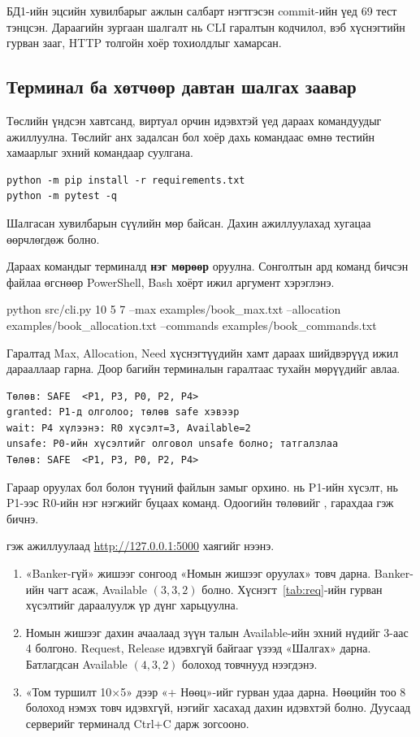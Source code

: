 БД1-ийн эцсийн  хувилбарыг ажлын салбарт нэгтгэсэн  commit-ийн үед 69 тест тэнцсэн. Дараагийн зургаан шалгалт нь CLI гаралтын кодчилол, вэб хүснэгтийн гурван зааг, HTTP толгойн хоёр тохиолдлыг хамарсан.
\newpage
\subsection{Терминал ба хөтчөөр давтан шалгах заавар}
 Төслийн үндсэн хавтсанд, виртуал орчин идэвхтэй үед дараах командуудыг ажиллуулна. Төслийг анх задалсан бол хоёр дахь командаас өмнө тестийн хамаарлыг эхний командаар суулгана.
\begin{Verbatim}[fontsize=\small,xleftmargin=5mm]
python -m pip install -r requirements.txt
python -m pytest -q
\end{Verbatim}
Шалгасан  хувилбарын сүүлийн мөр  байсан. Дахин ажиллуулахад хугацаа өөрчлөгдөж болно.

 Дараах командыг терминалд \textbf{нэг мөрөөр} оруулна. Сонголтын ард команд бичсэн файлаа өгснөөр PowerShell, Bash хоёрт ижил аргумент хэрэглэнэ.
\begin{flushleft}\small\ttfamily
python src/cli.py 10 5 7 --max examples/book\_max.txt --allocation examples/book\_allocation.txt --commands examples/book\_commands.txt
\end{flushleft}
Гаралтад Max, Allocation, Need хүснэгтүүдийн хамт дараах шийдвэрүүд ижил дарааллаар гарна. Доор багийн терминалын гаралтаас тухайн мөрүүдийг авлаа.
\begin{Verbatim}[fontsize=\small,xleftmargin=3mm]
Төлөв: SAFE  <P1, P3, P0, P2, P4>
granted: P1-д олголоо; төлөв safe хэвээр
wait: P4 хүлээнэ: R0 хүсэлт=3, Available=2
unsafe: P0-ийн хүсэлтийг олговол unsafe болно; татгалзлаа
Төлөв: SAFE  <P1, P3, P0, P2, P4>
\end{Verbatim}
Гараар оруулах бол  болон түүний файлын замыг орхино.  нь P1-ийн хүсэлт,  нь P1-ээс R0-ийн нэг нэгжийг буцаах команд. Одоогийн төлөвийг \code{*}, гарахдаа  гэж бичнэ.

  гэж ажиллуулаад \url{http://127.0.0.1:5000} хаягийг нээнэ.
\begin{enumerate}
\item «Banker-гүй» жишээг сонгоод «Номын жишээг оруулах» товч дарна. Banker-ийн чагт асаж, Available $(3,3,2)$ болно. Хүснэгт~\ref{tab:req}-ийн гурван хүсэлтийг дараалуулж үр дүнг харьцуулна.
\item Номын жишээг дахин ачаалаад зүүн талын Available-ийн эхний нүдийг 3-аас 4 болгоно. Request, Release идэвхгүй байгааг үзээд «Шалгах» дарна. Батлагдсан Available $(4,3,2)$ болоход товчнууд нээгдэнэ.
\item «Том туршилт 10×5» дээр «+ Нөөц»-ийг гурван удаа дарна. Нөөцийн тоо 8 болоход нэмэх товч идэвхгүй, нэгийг хасахад дахин идэвхтэй болно. Дуусаад серверийг терминалд Ctrl+C дарж зогсооно.
\end{enumerate}
\newpage
